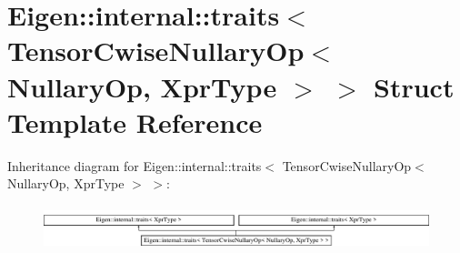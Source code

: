 \hypertarget{struct_eigen_1_1internal_1_1traits_3_01_tensor_cwise_nullary_op_3_01_nullary_op_00_01_xpr_type_01_4_01_4}{}\section{Eigen\+:\+:internal\+:\+:traits$<$ Tensor\+Cwise\+Nullary\+Op$<$ Nullary\+Op, Xpr\+Type $>$ $>$ Struct Template Reference}
\label{struct_eigen_1_1internal_1_1traits_3_01_tensor_cwise_nullary_op_3_01_nullary_op_00_01_xpr_type_01_4_01_4}
Inheritance diagram for Eigen\+:\+:internal\+:\+:traits$<$ Tensor\+Cwise\+Nullary\+Op$<$ Nullary\+Op, Xpr\+Type $>$ $>$\+:\begin{figure}[H]
\begin{center}
\leavevmode
\includegraphics[height=1.308411cm]{struct_eigen_1_1internal_1_1traits_3_01_tensor_cwise_nullary_op_3_01_nullary_op_00_01_xpr_type_01_4_01_4}
\end{center}
\end{figure}
